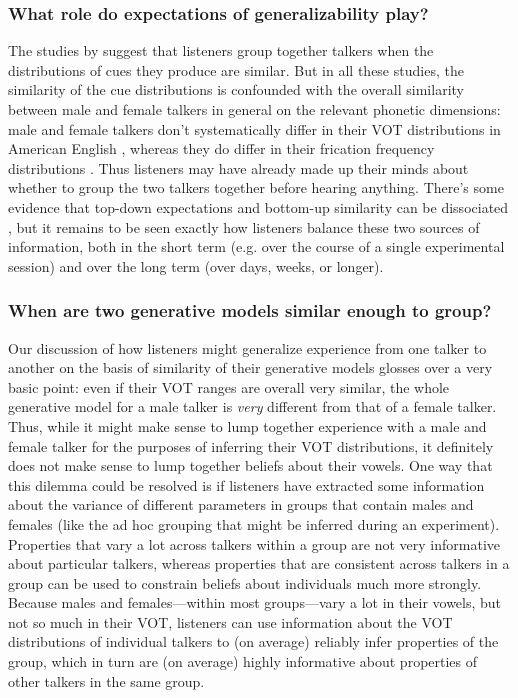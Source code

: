 \subsubsection{What role do expectations of generalizability play?}
\label{sec:what-role-expect}

The studies by  suggest that listeners group together talkers when the distributions of cues they produce are similar.  But in all these studies, the similarity of the cue distributions is confounded with the overall similarity between male and female talkers in general on the relevant phonetic dimensions: male and female talkers don't systematically differ in their VOT distributions in American English \cite{Allen2003}, whereas they do differ in their frication frequency distributions \cite{Newman2001}.  Thus listeners may have already made up their minds about whether to group the two talkers together before hearing anything.  There's some evidence that top-down expectations and bottom-up similarity can be dissociated \cite{Munson2011,Reinisch2014}, but it remains to be seen exactly how listeners balance these two sources of information, both in the short term (e.g. over the course of a single experimental session) and over the long term (over days, weeks, or longer).
\label{r1-reinisch2}

\subsubsection{When are two generative models similar enough to group?}
\label{sec:open-questions}

Our discussion of how listeners might generalize experience from one talker to another on the basis of similarity of their generative models glosses over a very basic point: even if their VOT ranges are overall very similar, the whole generative model for a male talker is \emph{very} different from that of a female talker.  Thus, while it might make sense to lump together experience with a male and female talker for the purposes of inferring their VOT distributions, it definitely does not make sense to lump together beliefs about their vowels.  One way that this dilemma could be resolved is if listeners have extracted some information about the variance of different parameters in groups that contain males and females (like the ad hoc grouping that might be inferred during an experiment).  Properties that vary a lot across talkers within a group are not very informative about particular talkers, whereas properties that are consistent across talkers in a group can be used to constrain beliefs about individuals much more strongly.  Because males and females---within most groups---vary a lot in their vowels, but not so much in their VOT, listeners can use information about the VOT distributions of individual talkers to (on average) reliably infer properties of the group, which in turn are (on average) highly informative about properties of other talkers in the same group.

